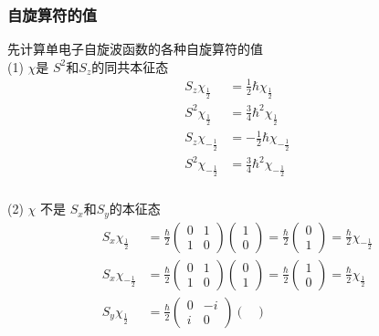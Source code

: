 \begin{frame}[label=current]
  \frametitle{自旋算符的值}
  先计算单电子自旋波函数的各种自旋算符的值 \\
  (1) $\chi$是 $S^2$和$S_z$的同共本征态
  \[\begin{aligned}
    S_z \chi_{\frac{1}{2}} &= \frac{1}{2}\hbar \chi_{\frac{1}{2}}  \\
    S^2 \chi_{\frac{1}{2}} &= \frac{3}{4}\hbar^2 \chi_{\frac{1}{2}}\\
    S_z \chi_{-\frac{1}{2}}&=-\frac{1}{2}\hbar \chi_{-\frac{1}{2}}  \\
    S^2 \chi_{-\frac{1}{2}}&= \frac{3}{4}\hbar^2 \chi_{-\frac{1}{2}}
  \end{aligned}\]
\end{frame} 

\begin{frame}[label=current]
  \frametitle{}
  (2) $\chi$ 不是 $S_x$和$S_y$的本征态
  \[\begin{aligned}
    S_x \chi_{\frac{1}{2}} &= \frac{\hbar}{2}\begin{pmatrix}
      0 & 1\\
      1 & 0
     \end{pmatrix} \begin{pmatrix}
      1\\
      0
     \end{pmatrix}  = \frac{\hbar}{2} \begin{pmatrix}
      0\\
      1
    \end{pmatrix} = \frac{\hbar}{2}\chi_{-\frac{1}{2}} \\
    S_x \chi_{-\frac{1}{2}} &= \frac{\hbar}{2}\begin{pmatrix}
      0 & 1\\
      1 & 0
     \end{pmatrix} \begin{pmatrix}
      0\\
      1
     \end{pmatrix}  = \frac{\hbar}{2} \begin{pmatrix}
      1\\
      0
    \end{pmatrix} = \frac{\hbar}{2}\chi_{\frac{1}{2}} \\
    S_y \chi_{\frac{1}{2}} &= \frac{\hbar}{2}\begin{pmatrix}
      0 & -i\\
      i & 0
     \end{pmatrix} \begin{pmatrix}

\end{pmatrix}
\end{aligned}\]
\end{frame}
